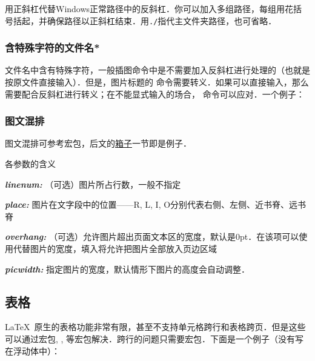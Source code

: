 用正斜杠代替Windows正常路径中的反斜杠．你可以加入多组路径，每组用花括号括起，并确保路径以正斜杠结束．用\verb|./|指代主文件夹路径，也可省略．\dpar

\subsubsection{含特殊字符的文件名*}
文件名中含有特殊字符，一般插图命令中是不需要加入反斜杠进行处理的（也就是按原文件直接输入）．但是，图片标题的  命令需要转义．如果可以直接输入，那么需要配合反斜杠进行转义；在不能显式输入的场合，  命令可以应对．一个例子：
\begin{latex}
\end{latex}

\subsubsection{图文混排}
图文混排可参考宏包，后文的\hyperref[sec:box]{箱子}一节即是例子．
\begin{latex}
\end{latex}

各参数的含义
\begin{inlinee}
\item {\bfseries\itshape linenum:} （可选）图片所占行数，一般不指定
\item {\bfseries\itshape place:} 图片在文字段中的位置——R, L, I, O分别代表右侧、左侧、近书脊、远书脊
\item {\bfseries\itshape overhang:} （可选）允许图片超出页面文本区的宽度，默认是0pt．在该项可以使用代替图片的宽度，填入将允许把图片全部放入页边区域
\item {\bfseries\itshape picwidth:} 指定图片的宽度，默认情形下图片的高度会自动调整．
\end{inlinee}

\subsection{表格}
\LaTeX\ 原生的表格功能非常有限，甚至不支持单元格跨行和表格跨页．但是这些可以通过宏包, , 等宏包解决．跨行的问题只需要宏包．下面是一个例子（没有写在浮动体中）：

